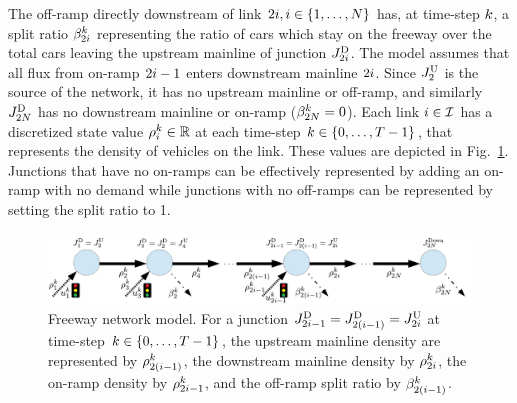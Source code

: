 The off-ramp directly downstream of link $2i,i\in\left\{ 1,\ldots,N\right\}$
has, at time-step $k$, a split ratio $\beta_{2i}^{k}$
representing the ratio of cars which stay on the freeway over the
total cars leaving the upstream mainline of junction $J_{2i}^{\text{D}}$.
The model assumes that all flux from on-ramp $2i-1$ enters downstream
mainline $2i$. Since $J_{2}^{\text{U}}$ is the source of the network,
it has no upstream mainline or off-ramp, and similarly $J_{2N}^{\text{D}}$
has no downstream mainline or on-ramp ($\beta_{2N}^{k}=0$).
Each link $i\in\mathcal{I}$ has a discretized state value $\rho_{i}^{k}\in\mathbb{R}$
at each time-step $k\in\left\{ 0,\ldots,T-1\right\}$, that represents
the density of vehicles on the link. These values are depicted in
Fig.~\ref{fig:Freeway-network-junction}. Junctions that have no
on-ramps can be effectively represented by adding an on-ramp with no
demand while junctions with no off-ramps can be represented by setting
the split ratio to 1.
\begin{figure}
	\begin{centering}
		\includegraphics[width=1\columnwidth]{figs-gen/rm-junction-2}
		\par\end{centering}
				
		\caption{Freeway network model. For a junction $J_{2i-1}^{\text{D}}=J_{2\left(i-1\right)}^{\text{D}}=J_{2i}^{\text{U}}$
			at time-step $k\in\left\{ 0,\ldots,T-1\right\}$, the upstream mainline
			density are represented by $\rho_{2\left(i-1\right)}^{k}$,
			the downstream mainline density by $\rho_{2i}^{k}$,
			the on-ramp density by $\rho_{2i-1}^{k}$, and the
			off-ramp split ratio by $\beta_{2\left(i-1\right)}^{k}$.\label{fig:Freeway-network-junction}}
		\end{figure}
				
